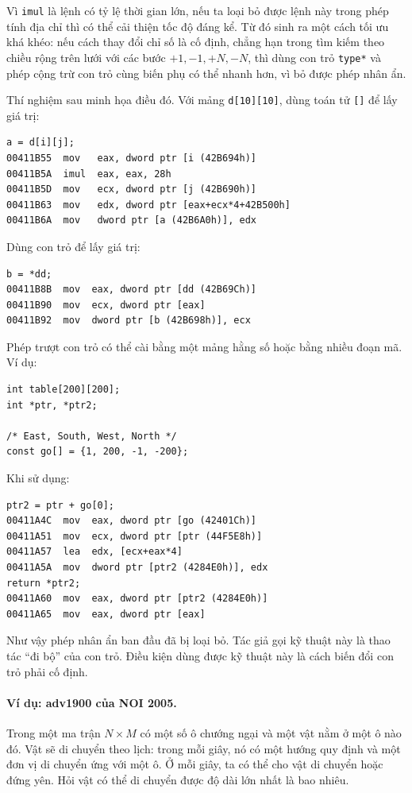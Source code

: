 \documentclass[11pt]{article}
\begin{document}
Vì \texttt{imul} là lệnh có tỷ lệ thời gian lớn, nếu ta loại bỏ được lệnh này
trong phép tính địa chỉ thì có thể cải thiện tốc độ đáng kể. Từ đó sinh ra một
cách tối ưu khá khéo: nếu cách thay đổi chỉ số là cố định, chẳng hạn trong tìm
kiếm theo chiều rộng trên lưới với các bước \(+1,-1,+N,-N\), thì dùng con trỏ
\texttt{type*} và phép cộng trừ con trỏ cùng biến phụ có thể nhanh hơn, vì bỏ
được phép nhân ẩn.

Thí nghiệm sau minh họa điều đó. Với mảng \texttt{d[10][10]}, dùng toán tử
\texttt{[]} để lấy giá trị:
\begin{verbatim}
a = d[i][j];
00411B55  mov   eax, dword ptr [i (42B694h)]
00411B5A  imul  eax, eax, 28h
00411B5D  mov   ecx, dword ptr [j (42B690h)]
00411B63  mov   edx, dword ptr [eax+ecx*4+42B500h]
00411B6A  mov   dword ptr [a (42B6A0h)], edx
\end{verbatim}

Dùng con trỏ để lấy giá trị:
\begin{verbatim}
b = *dd;
00411B8B  mov  eax, dword ptr [dd (42B69Ch)]
00411B90  mov  ecx, dword ptr [eax]
00411B92  mov  dword ptr [b (42B698h)], ecx
\end{verbatim}

Phép trượt con trỏ có thể cài bằng một mảng hằng số hoặc bằng nhiều đoạn mã.
Ví dụ:
\begin{verbatim}
int table[200][200];
int *ptr, *ptr2;

/* East, South, West, North */
const go[] = {1, 200, -1, -200};
\end{verbatim}

Khi sử dụng:
\begin{verbatim}
ptr2 = ptr + go[0];
00411A4C  mov  eax, dword ptr [go (42401Ch)]
00411A51  mov  ecx, dword ptr [ptr (44F5E8h)]
00411A57  lea  edx, [ecx+eax*4]
00411A5A  mov  dword ptr [ptr2 (4284E0h)], edx
return *ptr2;
00411A60  mov  eax, dword ptr [ptr2 (4284E0h)]
00411A65  mov  eax, dword ptr [eax]
\end{verbatim}

Như vậy phép nhân ẩn ban đầu đã bị loại bỏ. Tác giả gọi kỹ thuật này là thao
tác ``đi bộ'' của con trỏ. Điều kiện dùng được kỹ thuật này là cách biến đổi
con trỏ phải cố định.

\paragraph{Ví dụ: adv1900 của NOI 2005.}
Trong một ma trận \(N\times M\) có một số ô chướng ngại và một vật nằm ở một ô
nào đó. Vật sẽ di chuyển theo lịch: trong mỗi giây, nó có một hướng quy định
và một đơn vị di chuyển ứng với một ô. Ở mỗi giây, ta có thể cho vật di chuyển
hoặc đứng yên. Hỏi vật có thể di chuyển được độ dài lớn nhất là bao nhiêu.
\end{document}
